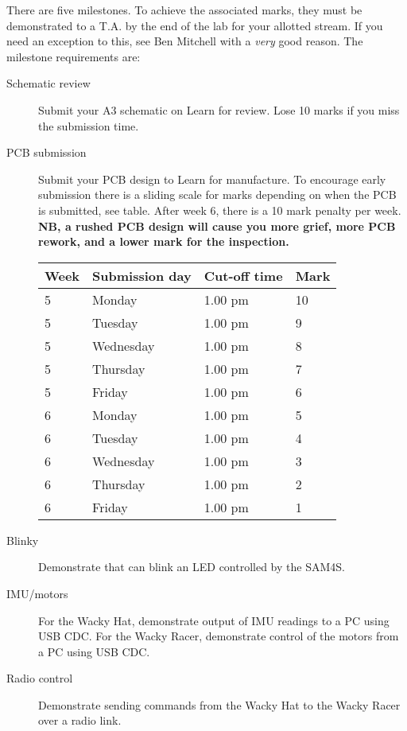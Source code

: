 \documentclass[11pt, a4paper]{article}
\begin{document}
There are five milestones.  To achieve the associated marks, they must
be demonstrated to a T.A. by the end of the lab for your allotted
stream.  If you need an exception to this, see Ben Mitchell with a
\emph{very} good reason.  The milestone requirements are:
%
\begin{description}
\item [Schematic review] Submit your A3 schematic on Learn for
  review.  Lose 10 marks if you miss the submission time.

\item [PCB submission] Submit your PCB design to Learn for
  manufacture.  To encourage early submission there is a sliding scale
  for marks depending on when the PCB is submitted, see table.  After
  week 6, there is a 10 mark penalty per week.  \textbf{NB, a rushed
    PCB design will cause you more grief, more PCB rework, and a lower
    mark for the inspection.}

  \begin{tabular}{llll}
    Week & Submission day & Cut-off time  & Mark \\ \hline
    5    & Monday       & 1.00 pm & 10 \\
    5    & Tuesday      & 1.00 pm & 9 \\
    5    & Wednesday    & 1.00 pm & 8 \\
    5    & Thursday     & 1.00 pm & 7 \\
    5    & Friday       & 1.00 pm & 6 \\
    6    & Monday       & 1.00 pm & 5 \\
    6    & Tuesday      & 1.00 pm & 4 \\
    6    & Wednesday    & 1.00 pm & 3 \\
    6    & Thursday     & 1.00 pm & 2 \\
    6    & Friday       & 1.00 pm & 1  \\
  \end{tabular}

\item [Blinky] Demonstrate that can blink an LED controlled by the SAM4S.

\item [IMU/motors] For the Wacky Hat, demonstrate output of IMU
  readings to a PC using USB CDC.  For the Wacky Racer, demonstrate
  control of the motors from a PC using USB CDC.

\item[Radio control] Demonstrate sending commands from the Wacky Hat
  to the Wacky Racer over a radio link.
\end{description}
\end{document}
